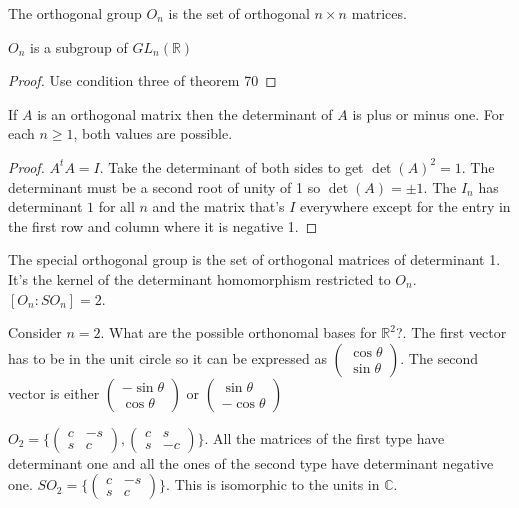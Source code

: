\documentclass{article}
\newcommand{\C}{\mathbb{C}}
\newcommand{\R}{\mathbb{R}}
\begin{document}
\begin{definition}
The orthogonal group $O_n$ is the set of orthogonal $n\times n$ matrices.
\end{definition}
\begin{proposition}
$O_n$ is a subgroup of $GL_n(\R)$
\end{proposition}
\begin{proof}
Use condition three of theorem 70
\end{proof}
\begin{proposition}
If $A$ is an orthogonal matrix then the determinant of $A$ is plus or minus one. For each $n\geq 1$, both values are possible.
\end{proposition}
\begin{proof}
$A^tA=I$. Take the determinant of both sides to get $\det(A)^2=1$. The determinant must be a second root of unity of 1 so $\det(A)=\pm 1$. The $I_n$ has determinant $1$ for all $n$ and the matrix that's $I$ everywhere except for the entry in the first row and column where it is negative 1.
\end{proof}
\begin{definition}
The special orthogonal group is the set of orthogonal matrices of determinant 1. It's the kernel of the determinant homomorphism restricted to $O_n$. $[O_n:SO_n]=2$.
\end{definition}
\begin{example}
Consider $n=2$. What are the possible orthonomal bases for $\R^2$?. The first vector has to be in the unit circle so it can be expressed as $\begin{pmatrix}
\cos\theta\\\sin\theta
\end{pmatrix}$. The second vector is either $\begin{pmatrix}
-\sin\theta\\\cos\theta
\end{pmatrix}$ or $\begin{pmatrix}
\sin\theta\\-\cos\theta
\end{pmatrix}$
\end{example}
\begin{corollary}
$O_2=\{\begin{pmatrix}
c&-s\\s&c
\end{pmatrix},\begin{pmatrix}
c&s\\s&-c
\end{pmatrix}\}$. All the matrices of the first type have determinant one and all the ones of the second type have determinant negative one. $SO_2=\{\begin{pmatrix}
c&-s\\s&c
\end{pmatrix}\}$. This is isomorphic to the units in $\C$.
\end{corollary}
\end{document}
